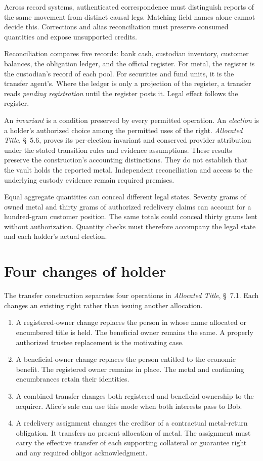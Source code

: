 \documentclass{momentum}
\begin{document}
Across record systems, authenticated correspondence must distinguish reports of the same movement from distinct causal legs. Matching field names alone cannot decide this. Corrections and alias reconciliation must preserve consumed quantities and expose unsupported credits.

Reconciliation compares five records: bank cash, custodian inventory, customer balances, the obligation ledger, and the official register. For metal, the register is the custodian's record of each pool. For securities and fund units, it is the transfer agent's. Where the ledger is only a projection of the register, a transfer reads \emph{pending registration} until the register posts it. Legal effect follows the register.

An \emph{invariant} is a condition preserved by every permitted operation. An \emph{election} is a holder's authorized choice among the permitted uses of the right. \emph{Allocated Title}, \S~5.6, proves its per-election invariant and conserved provider attribution under the stated transition rules and evidence assumptions. These results preserve the construction's accounting distinctions. They do not establish that the vault holds the reported metal. Independent reconciliation and access to the underlying custody evidence remain required premises.

Equal aggregate quantities can conceal different legal states. Seventy grams of owned metal and thirty grams of authorized redelivery claims can account for a hundred-gram customer position. The same totals could conceal thirty grams lent without authorization. Quantity checks must therefore accompany the legal state and each holder's actual election.

\section{Four changes of holder}

The transfer construction separates four operations in \emph{Allocated Title}, \S~7.1. Each changes an existing right rather than issuing another allocation.

\begin{enumerate}
\item A registered-owner change replaces the person in whose name allocated or encumbered title is held. The beneficial owner remains the same. A properly authorized trustee replacement is the motivating case.
\item A beneficial-owner change replaces the person entitled to the economic benefit. The registered owner remains in place. The metal and continuing encumbrances retain their identities.
\item A combined transfer changes both registered and beneficial ownership to the acquirer. Alice's sale can use this mode when both interests pass to Bob.
\item A redelivery assignment changes the creditor of a contractual metal-return obligation. It transfers no present allocation of metal. The assignment must carry the effective transfer of each supporting collateral or guarantee right and any required obligor acknowledgment.
\end{enumerate}
\end{document}
